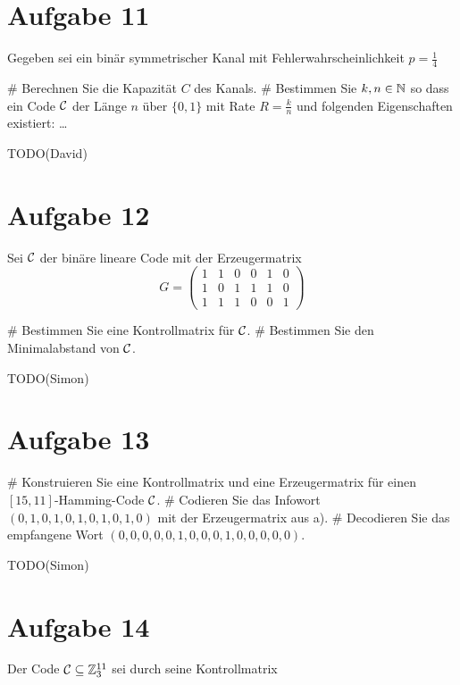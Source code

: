 
\setcounter{MaxMatrixCols}{20}

\section*{Aufgabe 11}
Gegeben sei ein binär symmetrischer Kanal mit Fehlerwahrscheinlichkeit $p = \frac{1}{4}$
\begin{myList}
#
Berechnen Sie die Kapazität $C$ des Kanals.
#
Bestimmen Sie $k,n \in \mathbb{N}$ so dass ein Code $\mathcal{C}$ der Länge $n$ über $\lbrace 0,1 \rbrace$ mit Rate $R = \frac{k}{n}$ und folgenden Eigenschaften existiert: \ldots
\end{myList}
TODO(David)

\section*{Aufgabe 12}
Sei $\mathcal{C}$ der binäre lineare Code mit der Erzeugermatrix
\begin{equation*}
	G = \begin{pmatrix}
		1 & 1 & 0 & 0 & 1 & 0 \\
		1 & 0 & 1 & 1 & 1 & 0 \\
		1 & 1 & 1 & 0 & 0 & 1
	\end{pmatrix}
\end{equation*}
\begin{myList}
#
Bestimmen Sie eine Kontrollmatrix für $\mathcal{C}$.
#
Bestimmen Sie den Minimalabstand von $\mathcal{C}$.
\end{myList}
TODO(Simon)

\section*{Aufgabe 13}
\begin{myList}
#
Konstruieren Sie eine Kontrollmatrix und eine Erzeugermatrix für einen $[15,11]$-Hamming-Code $\mathcal{C}$.
#
Codieren Sie das Infowort $(0,1,0,1,0,1,0,1,0,1,0)$ mit der Erzeugermatrix aus a).
#
Decodieren Sie das empfangene Wort $(0,0,0,0,0,1,0,0,0,1,0,0,0,0,0)$.
\end{myList}
TODO(Simon)

\section*{Aufgabe 14}
Der Code $\mathcal{C} \subseteq \mathbb{Z}^{11}_3$ sei durch seine Kontrollmatrix

